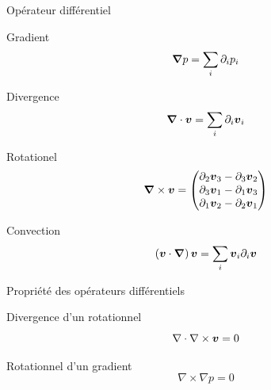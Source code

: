 \begin{frame}{Opérateur différentiel}

\begin{block}{Gradient}
\begin{equation*}
 {\boldsymbol {\nabla}}p=\sum_{i}\partial_{i}p_{i}
\end{equation*}
\end{block}

\begin{block}{Divergence}
\begin{equation*}
 {\boldsymbol {\nabla}}\cdot {\boldsymbol {v}}=\sum_{i}\partial_{i}{\boldsymbol {v}}_{i}
\end{equation*}
\end{block}

\begin{block}{Rotationel}
\begin{equation*}
 {\boldsymbol {\nabla}} \times {\boldsymbol {v}}=\begin{pmatrix}
                                \partial_{2}{\boldsymbol {v}}_{3}-\partial_{3}{\boldsymbol {v}}_{2}\\
                                \partial_{3}{\boldsymbol {v}}_{1}-\partial_{1}{\boldsymbol {v}}_{3}\\
                                \partial_{1}{\boldsymbol {v}}_{2}-\partial_{2}{\boldsymbol {v}}_{1}\\
                               \end{pmatrix}
 \end{equation*}
\end{block}


\begin{block}{Convection}
\begin{equation*}
 \left({\boldsymbol {v}}\cdot {\boldsymbol {\nabla}}\right){\boldsymbol {v}}=\sum_{i} {\boldsymbol {v}}_{i}\partial_{i} {\boldsymbol {v}}
 \end{equation*}
\end{block}


\end{frame}
\begin{frame}[<+->]{Propriété des opérateurs différentiels}
 \begin{property}{Divergence d'un rotationnel}
  \begin{equation*}
  \nabla \cdot \nabla \times {\boldsymbol {v}}=0
  \end{equation*}
 \end{property}

 \begin{property}{Rotationnel d'un gradient}
  \begin{equation*}
  \nabla \times \nabla p=0
  \end{equation*}
 \end{property}
\end{frame}
